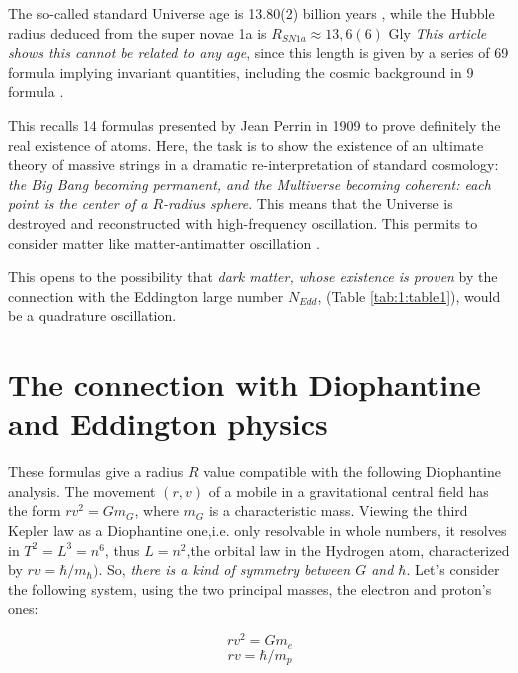 \documentclass[a4paper,9pt]{article}
\begin{document}
    
    The so-called standard Universe age is 13.80(2) billion years \cite{Tanabashi}, while the Hubble radius deduced from the super novae 1a is $R_{SN1a} \approx 13,6(6)$ Gly \cite{Freeman}\textit{This article shows this cannot be related to any age}, since this length is given by a series of 69 formula implying invariant quantities, including the cosmic background in 9 formula . 
    
    
    This recalls 14 formulas presented by Jean Perrin in 1909 to prove definitely the real existence of atoms. Here, the task is to show the existence of an ultimate theory of massive strings in a dramatic re-interpretation of standard cosmology:\textit{ the Big Bang becoming permanent, and the Multiverse becoming coherent: each point is the center of a $R$-radius sphere}. This means that the Universe is destroyed and reconstructed with high-frequency oscillation. This permits to consider matter like matter-antimatter oscillation \cite{Sanchez2}. 
    
    This opens to the possibility that \textit {dark matter, whose existence is proven} by the connection with the Eddington large number $N_{Edd}$, (Table \ref{tab:1:table1}), would be a quadrature oscillation.









    \section{The connection with Diophantine and Eddington physics}

These formulas give a radius $R$ value compatible with the following Diophantine analysis. The movement $(r,v)$ of a mobile in a gravitational central field has the form $r v^2 = Gm_G$, where $m_G$ is a characteristic mass. Viewing the third Kepler law as a Diophantine one,i.e. only resolvable in whole numbers, it resolves in  $T^2 = L^3 = n^6$, thus $L = n^2$,the orbital law in the Hydrogen atom, characterized by $rv = \hbar/m_{\hbar})$. So, \textit{there is a kind of symmetry between $G$ and $\hbar$}. Let's consider the following system, using the two principal masses, the electron and proton's ones: 

\begin{equation}
  r v^2 = Gm_e
  \end{equation}
  \begin{equation}
r v = \hbar/m_p  
\end{equation}
\end{document}
